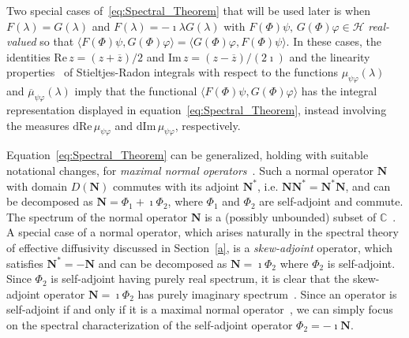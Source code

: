 \documentclass[leqno,onefignum,onetabnum]{siamltex1213}
\newcommand{\secref}[1]{Section~\ref{#1}}
\renewcommand{\d}{\mathrm{d}}
\newcommand\Real{\mbox{Re}\,} %
\newcommand\Imag{\mbox{Im}\,} %
\newcommand{\Nb}{\mathbf{N}}
\newcommand{\Hs}{\mathscr{H}}
\begin{document}
Two special cases of~\eqref{eq:Spectral_Theorem} that will be used
later is when $F(\lambda)=G(\lambda)$ and $F(\lambda)=-\imath\lambda G(\lambda)$ with $F(\Phi)\psi,\,G(\Phi)\varphi\in\Hs$
\emph{real-valued} so that $\langle F(\Phi)\psi,G(\Phi)\varphi\rangle=\langle G(\Phi)\varphi,F(\Phi)\psi\rangle$. In these
cases, the identities $\Real z=(z+\overline{z})/2$ and 
$\Imag z=(z-\overline{z})/(2\imath)$ and the linearity
properties~\cite{Stone:64} 
of Stieltjes-Radon integrals with respect to the functions $\mu_{\psi\varphi}(\lambda)$
and $\overline{\mu}_{\psi\varphi}(\lambda)$ imply that the functional $\langle F(\Phi)\psi,G(\Phi)\varphi\rangle$
has the integral representation displayed in
equation~\eqref{eq:Spectral_Theorem}, instead involving the measures 
$\d\Real\mu_{\psi\varphi}$ and $\d\Imag\mu_{\psi\varphi}$, respectively.




Equation~\eqref{eq:Spectral_Theorem} can be generalized, holding with
suitable notational changes, for \emph{maximal normal
  operators}~\cite{Stone:64}. Such a normal operator $\Nb$ with domain 
$D(\Nb)$ commutes with its adjoint $\Nb^*$, i.e. $\Nb\Nb^*=\Nb^*\Nb$,
and can be decomposed as 
$\Nb=\Phi_1+\imath\Phi_2$, where $\Phi_1$ and $\Phi_2$ are self-adjoint and
commute. The spectrum of the normal operator $\Nb$ is a (possibly 
unbounded) subset of $\mathbb{C}$~\cite{Stone:64}. A special case of a
normal operator, which arises naturally in the 
spectral theory of effective diffusivity discussed in
\secref{a}, is a \emph{skew-adjoint} operator, which satisfies
$\Nb^*=-\Nb$ and can be decomposed as $\Nb=\imath\Phi_2$ where $\Phi_2$ is
self-adjoint. Since $\Phi_2$ is self-adjoint having purely real spectrum,
it is clear that the skew-adjoint operator $\Nb=\imath\Phi_2$ has purely
imaginary spectrum~\cite{Stone:64}. Since an operator is self-adjoint
if and only if it is a maximal normal operator~\cite{Stone:64}, we can
simply focus on the spectral characterization of the self-adjoint
operator $\Phi_2=-\imath\Nb$.
\end{document}
